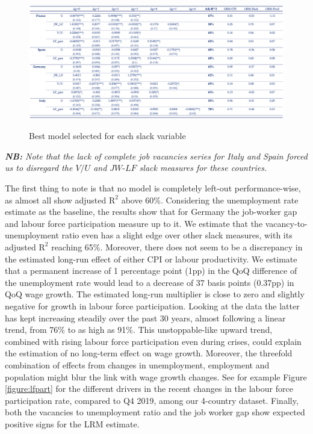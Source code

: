 \begin{figure}[H]
    \centering
    \caption{Best model selected for each slack variable}
    \includegraphics[width=1\textwidth]{Core/2.Labour/img/LRM table.png}
    \label{figure:lrm_table}
\end{figure}
\vspace{-1.5cm}
\noindent \textit{\textbf{NB:} Note that the lack of complete job vacancies series for Italy and Spain forced us to disregard the $V/U$ and $JW\textrm{-}LF$ slack measures for these countries.}

\quad The first thing to note is that no model is completely left-out performance-wise, as almost all show adjusted $\textrm{R}^{2}$ above 60\%. 
Considering the unemployment rate estimate as the baseline, the results show that for Germany the job-worker gap and labour force participation measure up to it. 
We estimate that the vacancy-to-unemployment ratio even has a slight edge over other slack measures, with its adjusted $\textrm{R}^{2}$ reaching 65\%. 
Moreover, there does not seem to be a discrepancy in the estimated long-run effect of either CPI or labour productivity. 
We estimate that a permanent increase of 1 percentage point (1pp) in the QoQ difference of the unemployment rate would lead to a decrease of 37 basis points (0.37pp) in QoQ wage growth. 
The estimated long-run multiplier is close to zero and slightly negative for growth in labour force participation. 
Looking at the data the latter has kept increasing steadily over the past 30 years, almost following a linear trend, from 76\% to as high as 91\%. 
This unstoppable-like upward trend, combined with rising labour force participation even during crises, could explain the estimation of no long-term effect on wage growth. 
Moreover, the threefold combination of effects from changes in unemployment, employment and population might blur the link with wage growth changes. 
See for example Figure \ref{figure:lfpart} for the different drivers in the recent changes in the labour force participation rate, compared to Q4 2019, among our 4-country dataset. 
Finally, both the vacancies to unemployment ratio and the job worker gap show expected positive signs for the LRM estimate. 

